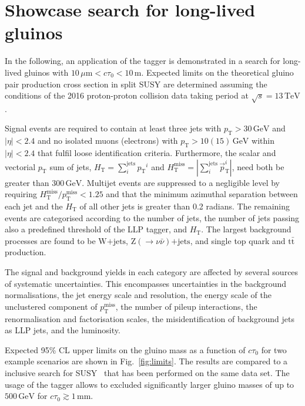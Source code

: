 \documentclass{webofc}
\newcommand{\ctau}{\ensuremath{c\tau_{0}}\xspace}
\newcommand{\pt}{\ensuremath{p_\textrm{T}}\xspace}
\newcommand{\jht}{\ensuremath{H_\textrm{T}}\xspace}
\newcommand{\jmht}{\ensuremath{H_\textrm{T}^\textrm{miss}}\xspace}
\newcommand{\met}{\ensuremath{p_\textrm{T}^\textrm{miss}}\xspace}
\newcommand{\ttbar}{\ensuremath{\textrm{t}\bar{\textrm{t}}}\xspace}
\newcommand{\wjets}{\ensuremath{\textrm{W+jets}}\xspace}
\newcommand{\znunu}{\ensuremath{\textrm{Z}(\to\nu\bar{\nu})\textrm{+jets}}\xspace}
\begin{document}
\section{Showcase search for long-lived gluinos}
\label{showcase}

In the following, an application of the tagger is demonstrated in a search for long-lived gluinos with $10\,\mu\textrm{m}<\ctau<10\,\textrm{m}$. Expected limits on the theoretical gluino pair production cross section in split SUSY are determined assuming the conditions of the 2016 proton-proton collision data taking period at $\sqrt{s}=13\,\textrm{TeV}$.

Signal events are required to contain at least three jets with $\pt>30\,\textrm{GeV}$ and $|\eta|<2.4$ and no isolated muons (electrons) with $\pt>10(15)\,\textrm{GeV}$ within $|\eta|<2.4$ that fulfil loose identification criteria. Furthermore, the scalar and vectorial \pt sum of jets, $\jht=\sum_{i}^\textrm{jets}\pt^{i}$ and $\jmht=|\sum_{i}^\textrm{jets}\vec{p}_\textrm{T}^{i}|$, need both be greater than $300\,\textrm{GeV}$. Multijet events are suppressed to a negligible level by requiring $\jmht/\met<1.25$ and that the minimum azimuthal separation between each jet and the $\jht$ of all other jets is greater than 0.2 radians. The remaining events are categorised according to the number of jets, the number of jets passing also a predefined threshold of the LLP tagger, and \jht. The largest background processes are found to be \wjets, \znunu, and single top quark and \ttbar production. 

The signal and background yields in each category are affected by several sources of systematic uncertainties. This encompasses uncertainties in the background normalisations, the jet energy scale and resolution, the energy scale of the unclustered component of \met, the number of pileup interactions, the renormalisation and factorisation scales, the misidentification of background jets as LLP jets, and the luminosity. 

Expected 95\% CL upper limits on the gluino mass as a function of \ctau for two example scenarios are shown in Fig.~\ref{fig:limits}. The results are compared to a 
inclusive search for SUSY~\cite{refsearch} that has been performed on the same data set. The usage of the tagger allows to excluded significantly larger gluino masses of up to $500\,\textrm{GeV}$ for $\ctau\gtrsim1\,\textrm{mm}$.
 
\end{document}
